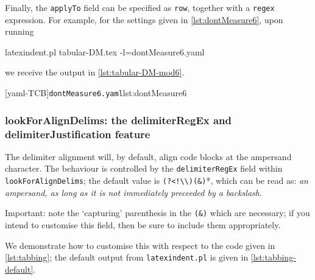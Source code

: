 	Finally, the \texttt{applyTo} field can be specified as \texttt{row}, together with a
	\texttt{regex} expression. For example, for the settings given in
	\cref{lst:dontMeasure6}, upon running
	\begin{commandshell} 
latexindent.pl tabular-DM.tex -l=dontMeasure6.yaml
\end{commandshell}
	we receive the output in \cref{lst:tabular-DM-mod6}.

	\begin{cmhtcbraster}
		[yaml-TCB]{\texttt{dontMeasure6.yaml}}{lst:dontMeasure6}
	\end{cmhtcbraster}

\subsubsection{lookForAlignDelims: the delimiterRegEx and delimiterJustification feature}\label{sec:delimiter-reg-ex}

	The delimiter alignment%
	 will, by default, align code blocks at the
	ampersand character. The behaviour is controlled by the \texttt{delimiterRegEx} field
	within \texttt{lookForAlignDelims}; the default value is
	\lstinline*'(?<!\\)(&)'*, which can be read as: \emph{an ampersand, as long as it is not
		immediately preceeded by a backslash}.

	\begin{warning}
		Important: note the `capturing' parenthesis in the \lstinline!(&)! which are necessary; if you
		intend to customise this field, then be sure to include them appropriately.
	\end{warning}

	We demonstrate how to customise this with respect to the code given in
	\cref{lst:tabbing}; the default output from \lstinline!latexindent.pl! is given in
	\cref{lst:tabbing-default}.

